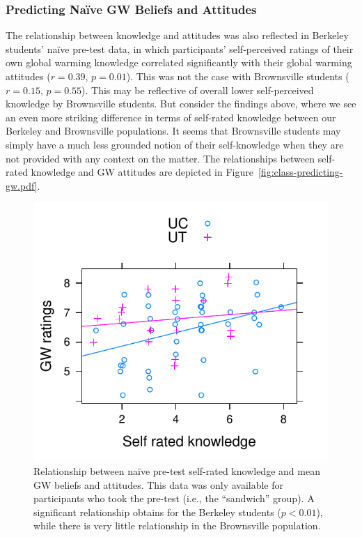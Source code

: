 \subsubsection{Predicting Na\"ive GW Beliefs and Attitudes}

The relationship between knowledge and attitudes was also reflected in Berkeley
students’ naïve pre-test data, in which participants’ self-perceived ratings of
their own global warming knowledge correlated significantly with their global
warming attitudes ($r = 0.39$, $p = 0.01$). This was not the case with
Brownsville students ($r = 0.15$, $p = 0.55$). This may be reflective of overall
lower self-perceived knowledge by Brownsville students. But consider the
findings above, where we see an even more striking difference in terms of
self-rated knowledge between our Berkeley and Brownsville populations. It seems
that Brownsville students may simply have a much less grounded notion of their
self-knowledge when they are not provided with any context on the matter. The
relationships between self-rated knowledge and GW attitudes are depicted in
Figure~\ref{fig:class-predicting-gw.pdf}.

\begin{figure}
    \centering
    \includegraphics{class-predicting-gw.pdf}
    \caption{Relationship between na\"ive pre-test self-rated knowledge and mean GW
        beliefs and attitudes. This data was only available for participants who
    took the pre-test (i.e., the “sandwich” group). A significant relationship
    obtains for the Berkeley students ($p < 0.01$), while there is very little
    relationship in the Brownsville population.}
    \label{fig:class-predicting-gw}
\end{figure}

